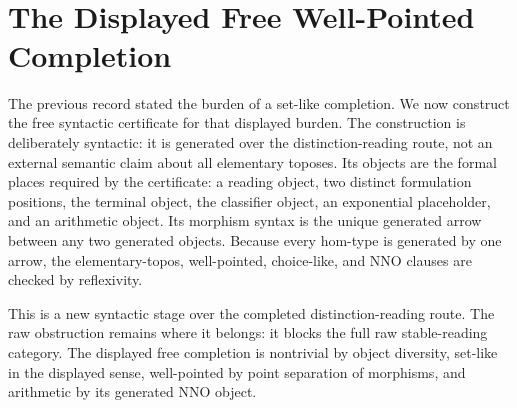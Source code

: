 \documentclass[11pt]{article}
\begin{document}
\begin{code}
\AgdaSymbol{(}\AgdaSpace{}%
\AgdaSymbol{)}\<%
\\
%
\>[4]%
\>[26]\AgdaSymbol{:}\<%
\\
\>[4][@{}l@{\AgdaIndent{0}}]%
\>[6]\AgdaSpace{}%
\AgdaSpace{}%
\AgdaSymbol{(}\AgdaSpace{}%
\AgdaSymbol{)}\<%
\\
%
\>[4]%
\>[26]\AgdaSymbol{:}\AgdaSpace{}%
\AgdaSpace{}%
\<%
\\
%
\>[4]\AgdaSpace{}%
\AgdaSymbol{:}\AgdaSpace{}%
\<%
\\
%
\\[\AgdaEmptyExtraSkip]%
\>[0]\AgdaSpace{}%
\AgdaSpace{}%
\<%
\end{code}

\section{The Displayed Free Well-Pointed Completion}

The previous record stated the burden of a set-like completion.  We now
construct the free syntactic certificate for that displayed burden.  The
construction is deliberately syntactic: it is generated over the
distinction-reading route, not an external semantic claim about all
elementary toposes.  Its objects are the formal places required by the
certificate: a reading object, two distinct formulation positions, the
terminal object, the classifier object, an exponential placeholder, and
an arithmetic object.  Its morphism syntax is the unique generated arrow
between any two generated objects.  Because every hom-type is generated
by one arrow, the elementary-topos, well-pointed, choice-like, and NNO
clauses are checked by reflexivity.

This is a new syntactic stage over the completed distinction-reading
route.  The raw obstruction remains where it belongs: it blocks the full
raw stable-reading category.  The displayed free completion is
nontrivial by object diversity, set-like in the displayed sense,
well-pointed by point separation of morphisms, and arithmetic by its
generated NNO object.
\end{document}

